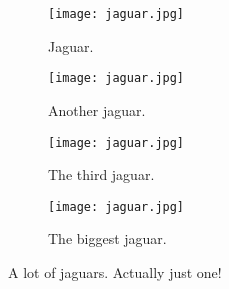 \documentclass{article}
\begin{document}
	\begin{figure}[h!]
		\centering
		\begin{subfigure}[b]{0.2\linewidth}
			
			\texttt{[image: jaguar.jpg]}
			\caption{Jaguar.}
		\end{subfigure}
	\begin{subfigure}[b]{0.2\linewidth}
		\texttt{[image: jaguar.jpg]}
		\caption{Another jaguar.}
	\end{subfigure}
    \begin{subfigure}[b]{0.2\linewidth}
    	\texttt{[image: jaguar.jpg]}
    	\caption{The third jaguar.}
    \end{subfigure}
    \begin{subfigure}[b]{0.5\linewidth}
    	\texttt{[image: jaguar.jpg]}
    	\caption{The biggest jaguar.}
    \end{subfigure}
    \caption{A lot of jaguars. Actually just one!}
    \label{fig:jaguar3}
\end{figure}

		
\end{document}
